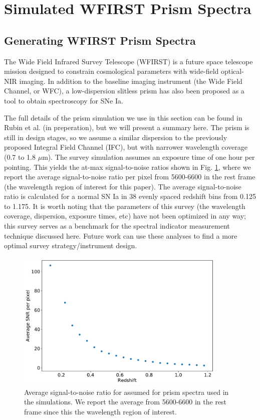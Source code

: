 \section{Simulated WFIRST Prism Spectra}
\label{wfirst}
\subsection{Generating WFIRST Prism Spectra}
The Wide Field Infrared Survey Telescope (WFIRST) is a future space telescope mission designed to constrain cosmological parameters with wide-field optical-NIR imaging. In addition to the baseline imaging instrument (the Wide Field Channel, or WFC), a low-dispersion slitless prism has also been proposed as a tool to obtain spectroscopy for SNe Ia.

The full details of the prism simulation we use in this section can be found in Rubin et al. (in preperation), but we will present a summary here. The prism is still in design stages, so we assume a similar dispersion to the previously proposed Integral Field Channel (IFC), but with narrower wavelength coverage (0.7 to 1.8 $\mu$m). The survey simulation assumes an exposure time of one hour per pointing. This yields the at-max signal-to-noise ratios shown in Fig. \ref{snr_wfirst_prism}, where we report the average signal-to-noise ratio per pixel from 5600-6600 \angstrom\; in the rest frame (the wavelength region of interest for this paper). The average signal-to-noise ratio is calculated for a normal SN Ia in 38 evenly spaced redshift bins from 0.125 to 1.175. It is worth noting that the parameters of this survey (the wavelength coverage, dispersion, exposure times, etc) have not been optimized in any way; this survey serves as a benchmark for the spectral indicator measurement technique discussed here. Future work can use these analyses to find a more optimal survey strategy/instrument design.

\begin{figure}[htbp]
    \centering
    \includegraphics[width=0.9\textwidth]{figures/si_feat_pca/wfirst_snr_vs_redshift.pdf}
    \caption{Average signal-to-noise ratio for assumed for prism spectra used in the simulations. We report the average from 5600-6600 \angstrom\; in the rest frame since this the wavelength region of interest.}
    \label{snr_wfirst_prism}
\end{figure}

